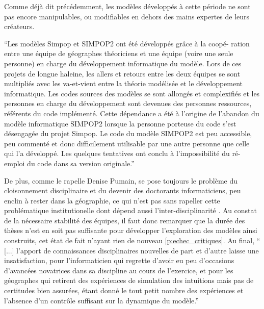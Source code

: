 Comme déjà dit précédemment, les modèles développés à cette période ne sont pas encore manipulables, ou modifiables en dehors des mains expertes de leurs créateurs. 

\enquote{Les modèles Simpop et SIMPOP2 ont été développés grâce à la coopé- ration entre une équipe de géographes théoriciens et une équipe (voire une seule personne) en charge du développement informatique du modèle. Lors de ces projets de longue haleine, les allers et retours entre les deux équipes se sont multipliés avec les va-et-vient entre la théorie modélisée et le développement informatique. Les codes sources des modèles se sont allongés et complexifiés et les personnes en charge du développement sont devenues des personnes ressources, référents du code implémenté. Cette dépendance a été à l’origine de l’abandon du modèle informatique SIMPOP2 lorsque la personne porteuse du code s’est désengagée du projet Simpop. Le code du modèle SIMPOP2 est peu accessible, peu commenté et donc difficilement utilisable par une autre personne que celle qui l’a développé. Les quelques tentatives ont conclu à l’impossibilité du ré-emploi du code dans sa version originale.}\autocite[112]{Schmitt2014} 

De plus, comme le rapelle Denise Pumain, se pose toujours le problème du cloisonnement disciplinaire et du devenir des doctorants informaticiens, peu enclin à rester dans la géographie, ce qui n'est pas sans rapeller cette problématique institutionelle dont dépend aussi l'inter-disciplinarité \autocite{Chapron2014}. Au constat de la nécessaire stabilité des équipes, il faut donc remarquer que la durée des thèses n'est en soit pas suffisante pour développer l'exploration des modèles ainsi construits, cet état de fait n'ayant rien de nouveau \ref{p:echec_critiques}. Au final, \enquote{ [...] l’apport de connaissances disciplinaires nouvelles de part et d’autre laisse une insatisfaction, pour l’informaticien qui regrette d’avoir eu peu d’occasions d’avancées novatrices dans sa discipline au cours de l’exercice, et pour les géographes qui retirent des expériences de simulation des intuitions mais pas de certitudes bien assurées, étant donné le tout petit nombre des expériences et l’absence d’un contrôle suffisant sur la dynamique du modèle.} \autocite{Pumain2014}

